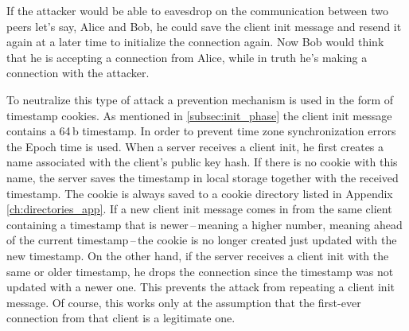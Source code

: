 If the attacker would be able to eavesdrop on the communication between two peers let's say, Alice and Bob, he could save the client init message and resend it again at a later time to initialize the connection again. Now Bob would think that he is accepting a connection from Alice, while in truth he's making a connection with the attacker.

To neutralize this type of attack a prevention mechanism is used in the form of timestamp cookies. As mentioned in \ref{subsec:init_phase} the client init message contains a 64\,b timestamp. In order to prevent time zone synchronization errors the Epoch time is used. When a server receives a client init, he first creates a name associated with the client's public key hash. If there is no cookie with this name, the server saves the timestamp in local storage together with the received timestamp. The cookie is always saved to a cookie directory listed in Appendix \ref{ch:directories_app}. If a new client init message comes in from the same client containing a timestamp that is newer\,--\,meaning a higher number, meaning ahead of the current timestamp\,--\,the cookie is no longer created just updated with the new timestamp. On the other hand, if the server receives a client init with the same or older timestamp, he drops the connection since the timestamp was not updated with a newer one. This prevents the attack from repeating a client init message. Of course, this works only at the assumption that the first-ever connection from that client is a legitimate one.
